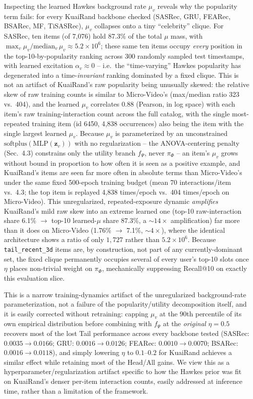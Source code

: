 Inspecting the learned Hawkes background rate $\mu_v$ reveals why the popularity term fails: for
every KuaiRand backbone checked (SASRec, GRU, FEARec, BSARec, MF, TiSASRec), $\mu_v$ collapses
onto a tiny ``celebrity'' clique. For SASRec, ten items (of 7{,}076) hold 87.3\% of the total
$\mu$ mass, with $\max_v \mu_v / \mathrm{median}_v\, \mu_v \approx 5.2\times 10^6$; these same ten
items occupy \emph{every} position in the top-10-by-popularity ranking across 300 randomly sampled
test timestamps, with learned excitation $\alpha_v \approx 0$ -- i.e.\ the ``time-varying'' Hawkes
popularity has degenerated into a time-\emph{invariant} ranking dominated by a fixed clique. This
is not an artifact of KuaiRand's raw popularity being unusually skewed: the relative skew of raw
training counts is similar to Micro-Video's (max/median ratio 323 vs.\ 404), and the learned
$\mu_v$ correlates $0.88$ (Pearson, in log space) with each item's raw training-interaction count
across the full catalog, with the single most-repeated training item (id 6450, 4{,}838
occurrences) also being the item with the single largest learned $\mu_v$. Because $\mu_v$ is
parameterized by an unconstrained $\mathrm{softplus}(\mathrm{MLP}(\mathbf z_v))$ with no
regularization -- the ANOVA-centering penalty (Sec.~4.3) constrains only the utility branch
$f_\Psi$, never $\pi_\Phi$ -- an item's $\mu_v$ grows without bound in proportion to how often it
is seen as a positive example, and KuaiRand's items are seen far more often in absolute terms than
Micro-Video's under the same fixed 500-epoch training budget (mean 70 interactions/item vs.\ 4.3;
the top item is replayed 4{,}838 times/epoch vs.\ 404 times/epoch on Micro-Video). This
unregularized, repeated-exposure dynamic \emph{amplifies} KuaiRand's mild raw skew into an extreme
learned one (top-10 raw-interaction share 6.1\% $\to$ top-10 learned-$\mu$ share 87.3\%, a
${\sim}14\times$ amplification) far more than it does on Micro-Video (1.76\% $\to$ 7.1\%,
${\sim}4\times$), where the identical architecture shows a ratio of only $1{,}727$ rather than
$5.2\times 10^6$. Because \texttt{tail\_recent\_3d} items are, by construction, not part of any
currently-dominant set, the fixed clique permanently occupies several of every user's top-10 slots
once $\eta$ places non-trivial weight on $\pi_\Phi$, mechanically suppressing Recall@10 on exactly
this evaluation slice.

This is a narrow training-dynamics artifact of the unregularized background-rate
parameterization, not a failure of the popularity/utility decomposition itself, and it is easily
corrected without retraining: capping $\mu_v$ at the $90$th percentile of its own empirical
distribution before combining with $f_\Psi$ at the \emph{original} $\eta=0.5$ recovers most of the
lost Tail performance across every backbone tested (SASRec: $0.0035\to0.0166$; GRU:
$0.0016\to0.0126$; FEARec: $0.0010\to0.0070$; BSARec: $0.0016\to0.0118$), and simply lowering
$\eta$ to $0.1$--$0.2$ for KuaiRand achieves a similar effect while retaining most of the Head/All
gains. We view this as a hyperparameter/regularization artifact specific to how the Hawkes prior
was fit on KuaiRand's denser per-item interaction counts, easily addressed at inference time,
rather than a limitation of the framework.
